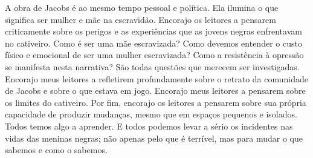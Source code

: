A obra de Jacobs é ao mesmo tempo pessoal e política. Ela ilumina o que
significa ser mulher e mãe na escravidão. Encorajo os leitores a
pensarem criticamente sobre os perigos e as experiências que as jovens
negras enfrentavam no cativeiro. Como é ser uma mãe escravizada? Como devemos
entender o custo físico e emocional de ser uma mulher escravizada? Como
a resistência à opressão se manifesta nesta narrativa? São todas
questões que merecem ser investigadas. Encorajo meus leitores a
refletirem profundamente sobre o retrato da comunidade de Jacobs e sobre
o que estava em jogo. Encorajo meus leitores a pensarem sobre os limites
do cativeiro. Por fim, encorajo os leitores a pensarem sobre sua própria
capacidade de produzir mudanças, mesmo que em espaços pequenos e
isolados. Todos temos algo a aprender. E todos podemos levar a sério os
incidentes nas vidas das meninas negras; não apenas pelo que é terrível,
mas para mudar o que sabemos e como o sabemos.
